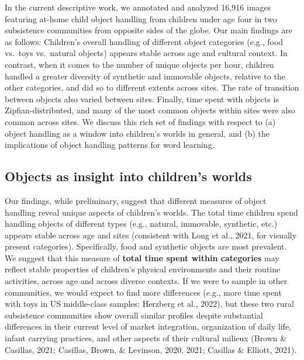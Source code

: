 \documentclass[10pt, letterpaper]{article}
\begin{document}
In the current descriptive work, we annotated and analyzed 16,916 images
featuring at-home child object handling from children under age four in
two subsistence communities from opposite sides of the globe. Our main
findings are as follows: Children's overall handling of different object
categories (e.g., food vs.~toys vs.~natural objects) appears stable
across age and cultural context. In contrast, when it comes to the
number of unique objects per hour, children handled a greater diversity
of synthetic and immovable objects, relative to the other categories,
and did so to different extents across sites. The rate of transition
between objects also varied between sites. Finally, time spent with
objects is Zipfian-distributed, and many of the most common objects
within sites were also common across sites. We discuss this rich set of
findings with respect to (a) object handling as a window into children's
worlds in general, and (b) the implications of object handling patterns
for word learning.

\hypertarget{objects-as-insight-into-childrens-worlds}{%
\subsection{Objects as insight into children's
worlds}\label{objects-as-insight-into-childrens-worlds}}

Our findings, while preliminary, suggest that different measures of
object handling reveal unique aspects of children's worlds. The total
time children spend handling objects of different types (e.g., natural,
immovable, synthetic, etc.) appears stable across age and sites
(consistent with Long et al., 2021, for visually present categories).
Specifically, food and synthetic objects are most prevalent. We suggest
that this measure of \textbf{total time spent within categories} may
reflect stable properties of children's physical environments and their
routine activities, across age and across diverse contexts. If we were
to sample in other communities, we would expect to find more differences
(e.g., more time spent with toys in US middle-class samples: Herzberg et
al., 2022), but these two rural subsistence communities show overall
similar profiles despite substantial differences in their current level
of market integration, organization of daily life, infant carrying
practices, and other aspects of their cultural milieux (Brown \&
Casillas, 2021; Casillas, Brown, \& Levinson, 2020, 2021; Casillas \&
Elliott, 2021).
\end{document}
